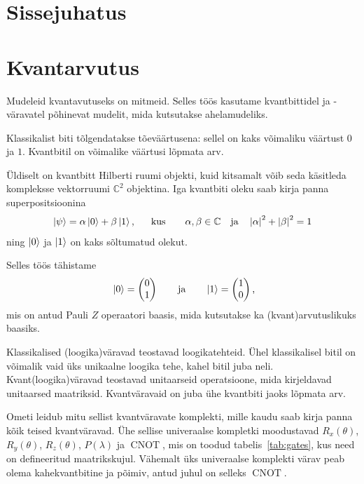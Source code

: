 \documentclass[12pt]{article}
\def\nonumsection#1{
    \clearpage\newpage\section*{#1}
    \addcontentsline{toc}{section}{#1}
}
\def\abs#1{\left|#1\right|}
\def\ket#1{\mathinner{|#1\rangle}}
\def\CNOT{\mathop{\mathrm{CNOT}}}
\begin{document}
\tableofcontents

\newpage\nonumsection{Sissejuhatus}

\newpage\section{Kvantarvutus}

Mudeleid kvantavutuseks on mitmeid.
Selles töös kasutame kvantbittidel ja -väravatel põhinevat mudelit, mida kutsutakse ahelamudeliks.

Klassikalist biti tõlgendatakse tõeväärtusena: sellel on kaks võimaliku väärtust \(0\) ja \(1\).
Kvantbitil on võimalike väärtusi lõpmata arv.

Üldiselt on kvantbitt Hilberti ruumi objekti, kuid kitsamalt võib seda käsitleda kompleksse vektorruumi \(\mathbb{C}^2\) objektina.
Iga kvantbiti oleku saab kirja panna superpositsioonina
\begin{align}\label{f:superpos}
    \ket\psi = \alpha\ket0 + \beta\ket1 \rlap{,}
    \qquad\text{kus}\qquad \alpha, \beta \in \mathbb{C}
    \quad\text{ja}\quad \abs{\alpha}^2 + \abs{\beta}^2 = 1
\end{align}
ning \(\ket0\) ja \(\ket1\) on kaks sõltumatud olekut.

Selles töös tähistame
\begin{align}
    \ket0 = \begin{pmatrix}
        0 \\
        1 \\
    \end{pmatrix}
    \qquad\text{ja}\qquad \ket1 = \begin{pmatrix}
        1 \\
        0 \\
    \end{pmatrix} \rlap{,}
\end{align}
mis on antud Pauli \(Z\) operaatori baasis, mida kutsutakse ka (kvant)arvutuslikuks baasiks.

Klassikalised (loogika)väravad teostavad loogikatehteid.
Ühel klassikalisel bitil on võimalik vaid üks unikaalne loogika tehe, kahel bitil juba neli.
Kvant(loogika)väravad teostavad unitaarseid operatsioone, mida kirjeldavad unitaarsed maatriksid.
Kvantväravaid on juba ühe kvantbiti jaoks lõpmata arv.

Ometi leidub mitu sellist kvantväravate komplekti, mille kaudu saab kirja panna kõik teised kvantväravad. 
Ühe sellise univeraalse kompletki moodustavad \(R_x(\theta)\), \(R_y(\theta)\), \(R_z(\theta)\), \(P(\lambda)\) ja \(\CNOT\), mis on toodud tabelis~\ref{tab:gates}, kus need on defineeritud maatrikskujul.
Vähemalt üks univeraalse komplekti värav peab olema kahekvantbitine ja põimiv, antud juhul on selleks \(\CNOT\).
\end{document}
